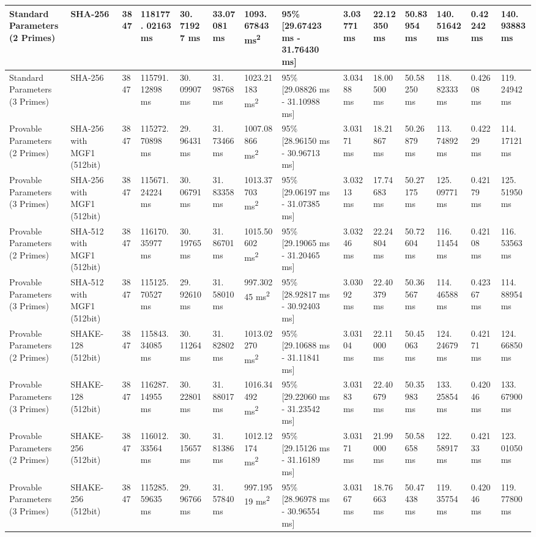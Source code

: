 \documentclass[]{final_report}
\theoremstyle{definition}
\begin{document}
\begin{landscape}
\begin{longtable}{|p{2.3cm}|p{1.8cm}|p{1.0cm}|p{1.7cm}|p{1.2cm}|p{1.5cm}|p{1.8cm}|p{1.5cm}|p{1.2cm}|p{1.5cm}|p{1.3cm}|p{1.2cm}|p{1.3cm}|p{1.3cm}|}
Standard Parameters (2 Primes) & SHA-256 & 3847 & 118177.
02163 ms & 30.
71927 ms & 33.07081 ms & 1093.
67843 ms\textsuperscript{2} & 95\% [29.67423 ms - 31.76430 ms] & 3.03771 ms & 22.12350 ms & 50.83954 ms & 140.
51642 ms & 0.42242 ms & 140.
93883 ms \\
\hline
Standard Parameters (3 Primes) & SHA-256 & 3847 & 115791.
12898 ms & 30.
09907 ms & 31.
98768 ms & 1023.21183 ms\textsuperscript{2} & 95\% [29.08826 ms - 31.10988 ms] & 3.03488 ms & 18.00500 ms & 50.58250 ms & 118.
82333 ms & 0.42608 ms & 119.
24942 ms \\
\hline
Provable Parameters (2 Primes) & SHA-256 with MGF1 (512bit) & 3847 & 115272.
70898 ms & 29.
96431 ms & 31.
73466 ms & 1007.08866 ms\textsuperscript{2} & 95\% [28.96150 ms - 30.96713 ms] & 3.03171 ms & 18.21867 ms & 50.26879 ms & 113.
74892 ms & 0.42229 ms & 114.
17121 ms \\
\hline
Provable Parameters (3 Primes) & SHA-256 with MGF1 (512bit) & 3847 & 115671.
24224 ms & 30.
06791 ms & 31.
83358 ms & 1013.37703 ms\textsuperscript{2} & 95\% [29.06197 ms - 31.07385 ms] & 3.03213 ms & 17.74683 ms & 50.27175 ms & 125.
09771 ms & 0.42179 ms & 125.
51950 ms \\
\hline
Provable Parameters (2 Primes) & SHA-512 with MGF1 (512bit) & 3847 & 116170.
35977 ms & 30.
19765 ms & 31.
86701 ms & 1015.50602 ms\textsuperscript{2} & 95\% [29.19065 ms - 31.20465 ms] & 3.03246 ms & 22.24804 ms & 50.72604 ms & 116.
11454 ms & 0.42108 ms & 116.
53563 ms \\
\hline
Provable Parameters (3 Primes) & SHA-512 with MGF1 (512bit) & 3847 & 115125.
70527 ms & 29.
92610 ms & 31.
58010 ms & 997.30245 ms\textsuperscript{2} & 95\% [28.92817 ms - 30.92403 ms] & 3.03092 ms & 22.40379 ms & 50.36567 ms & 114.
46588 ms & 0.42367 ms & 114.
88954 ms \\
\hline
Provable Parameters (2 Primes) & SHAKE-128 (512bit) & 3847 & 115843.
34085 ms & 30.
11264 ms & 31.
82802 ms & 1013.02270 ms\textsuperscript{2} & 95\% [29.10688 ms - 31.11841 ms] & 3.03104 ms & 22.11000 ms & 50.45063 ms & 124.
24679 ms & 0.42171 ms & 124.
66850 ms \\
\hline
Provable Parameters (3 Primes) & SHAKE-128 (512bit) & 3847 & 116287.
14955 ms & 30.
22801 ms & 31.
88017 ms & 1016.34492 ms\textsuperscript{2} & 95\% [29.22060 ms - 31.23542 ms] & 3.03183 ms & 22.40679 ms & 50.35983 ms & 133.
25854 ms & 0.42046 ms & 133.
67900 ms \\
\hline
Provable Parameters (2 Primes) & SHAKE-256 (512bit) & 3847 & 116012.
33564 ms & 30.
15657 ms & 31.
81386 ms & 1012.12174 ms\textsuperscript{2} & 95\% [29.15126 ms - 31.16189 ms] & 3.03171 ms & 21.99000 ms & 50.58658 ms & 122.
58917 ms & 0.42133 ms & 123.
01050 ms \\
\hline
Provable Parameters (3 Primes) & SHAKE-256 (512bit) & 3847 & 115285.
59635 ms & 29.
96766 ms & 31.
57840 ms & 997.19519 ms\textsuperscript{2} & 95\% [28.96978 ms - 30.96554 ms] & 3.03167 ms & 18.76663 ms & 50.47438 ms & 119.
35754 ms & 0.42046 ms & 119.
77800 ms \\
\hline


\end{longtable}
\end{landscape}
\end{document}
